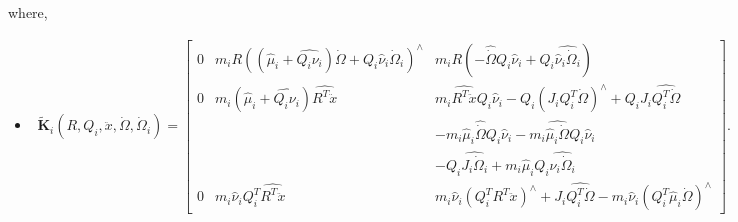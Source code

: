 \documentclass[10pt]{article}
\begin{document}
where,
\begin{itemize}
	\item \begin{align*}
	\tilde{\mathbf{K}}_i(R,Q_i,\ddot{x},\dot{\Omega},\dot{\Omega}_i) = 
	\begin{bmatrix}
	0 & m_i R ((\hat\mu_i+\widehat{Q_i\nu_i})\dot{\Omega} + Q_i\hat\nu_i\dot{\Omega}_i)^\wedge 
	& m_i R( -\hat{\dot{\Omega}} Q_i \hat\nu_i + Q_i \widehat{\hat \nu_i \dot{\Omega}_i}) \\
	0 & m_i(\hat\mu_i + \widehat{Q_i\nu_i})\widehat{R^T \ddot{x}}
	& m_i\widehat{R^T\ddot{x}}Q_i\hat\nu_i - Q_i (J_iQ_i^T\dot{\Omega})^\wedge + Q_i J_i \widehat{Q_i^T\dot{\Omega}} \\
	& & - m_i\hat\mu_i\hat{\dot{\Omega}} Q_i\hat\nu_i - m_i\widehat{\hat\mu_i\dot{\Omega}} Q_i \hat\nu_i \\
	& & - Q_i \widehat{J_i\dot{\Omega}_i} + m_i \hat\mu_i Q_i \widehat{\hat\nu_i \dot{\Omega}_i} \\
	0 & m_i \hat\nu_i Q_i^T \widehat{R^T\ddot{x}}
	& m_i \hat\nu_i (Q_i^T R^T \ddot{x})^\wedge + J_i\widehat{Q_i^T\dot{\Omega}} - m_i\hat\nu_i (Q_i^T\hat\mu_i \dot{\Omega})^\wedge
	\end{bmatrix}.
	\end{align*}
	

\end{itemize}
\end{document}
